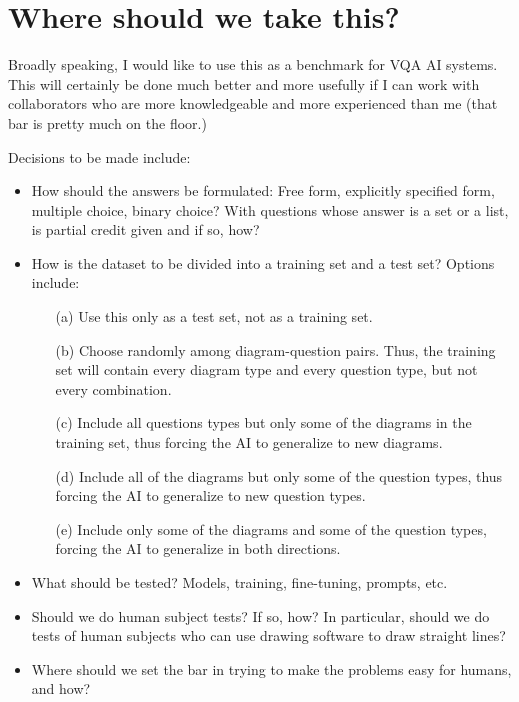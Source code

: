 \documentclass{article}    %
\begin{document}
\section{Where should we take this?}
\label{secFuture}

Broadly speaking, I would like to use this as a benchmark for VQA AI systems. 
This will certainly be done much better and more usefully if I can work with
collaborators who are more knowledgeable and more experienced than me (that 
bar is pretty much on the floor.)

\pagebreak

Decisions to be made include:
\begin{itemize}
\item How should the answers be formulated: Free form, explicitly specified
form, multiple choice, binary choice? With questions whose answer is a
set or a list, is partial credit given and if so, how?

\item How is the dataset to be divided into a training set and a test set?
Options include: 
\begin{itemize}
\item[(a)] Use this only as a test set, not as a training set.
\item[(b)] Choose randomly among diagram-question pairs. Thus, the training set will
contain every diagram type and every question type, but not every combination.
\item[(c)] Include all questions types but only some of the diagrams 
in the training set, thus forcing the AI to generalize to new diagrams.
\item[(d)] Include all of the diagrams but only some of the question types,
thus forcing the AI to generalize to new question types.
\item[(e)] Include only some of the diagrams and some of the question types,
forcing the AI to generalize in both directions.
\end{itemize}

\item What should be tested? Models, training, fine-tuning, prompts, etc.

\item Should we do human subject tests? If so, how? In particular, should we
do tests of human subjects who can use drawing software to draw straight lines?

\item Where should we set the bar in trying to make the problems easy for
humans, and how?
\end{itemize}
\end{document}
